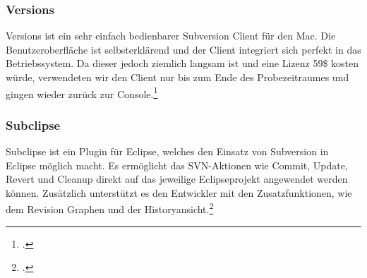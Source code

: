 \subsubsection{Versions}

Versions ist ein sehr einfach bedienbarer Subversion Client für den Mac. Die Benutzeroberfläche ist selbsterklärend und der Client integriert sich perfekt in das Betriebssystem. Da dieser jedoch ziemlich langsam ist und eine Lizenz 59\$ kosten würde, verwendeten wir den Client nur bis zum Ende des Probezeitraumes und gingen wieder zurück zur Console.\footcite[vgl.][]{versions}




\subsubsection{Subclipse}
Subclipse ist ein Plugin für Eclipse, welches den Einsatz von Subversion in Eclipse möglich macht. Es ermöglicht das SVN-Aktionen wie Commit, Update, Revert und Cleanup direkt auf das jeweilige Eclipseprojekt angewendet werden können. Zusätzlich unterstützt es den Entwickler mit den Zusatzfunktionen, wie dem Revision Graphen und der Historyansicht.\footcite[vgl.][]{subclipse}


